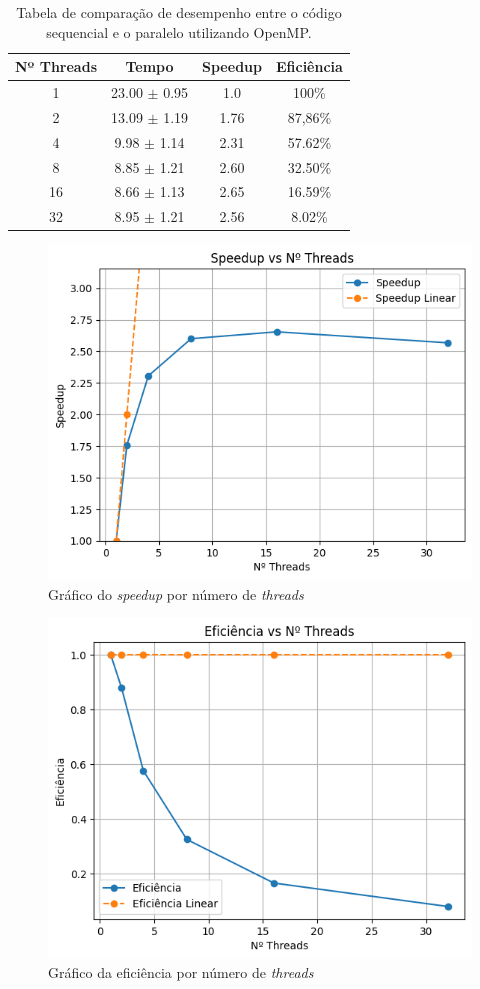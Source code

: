 \documentclass[12pt]{article}
\begin{document}
\begin{table}[ht]
\centering
\caption{Tabela de comparação de desempenho entre o código sequencial e o paralelo utilizando OpenMP.}
\vspace{0.3cm}
\begin{tabular}{||c c c c||} 
 \hline
 Nº Threads & Tempo & Speedup & Eficiência \\ [0.5ex] 
 \hline\hline
 1 & 23.00 $\pm$ 0.95 & 1.0 & 100\% \\ 
 \hline
 2 & 13.09 $\pm$ 1.19 &  1.76 & 87,86\% \\
 \hline
 4 & 9.98 $\pm$ 1.14 & 2.31 & 57.62\% \\
 \hline
 8 & 8.85 $\pm$ 1.21 & 2.60 & 32.50\% \\
 \hline
 16 & 8.66 $\pm$ 1.13 & 2.65 & 16.59\% \\
 \hline
 32 & 8.95 $\pm$ 1.21 & 2.56 & 8.02\% \\ 
 \hline
\end{tabular}
\end{table}

\begin{figure}[ht]
\centering
\includegraphics[width=.5\textwidth]{figs/speedupxthreads.png}
\caption{Gráfico do \textit{speedup} por número de \textit{threads}}
\label{fig:speedupOMP}
\end{figure}

\begin{figure}[ht]
\centering
\includegraphics[width=.5\textwidth]{figs/eficienciaxthreads.png}
\caption{Gráfico da eficiência por número de \textit{threads}}
\label{fig:eficienciaOMP}
\end{figure}
\end{document}
